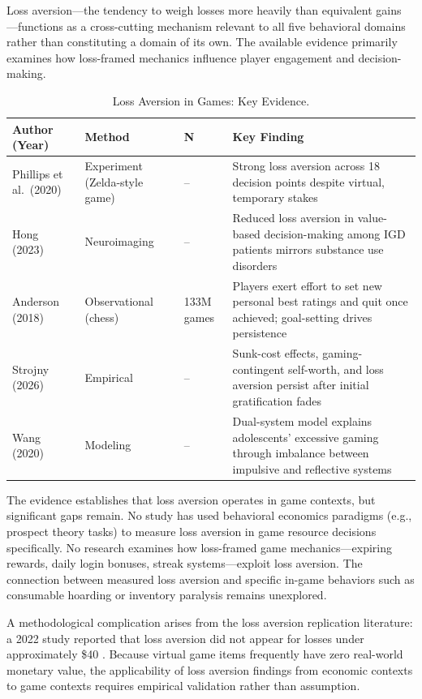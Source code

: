 \documentclass[12pt]{article}
\begin{document}
Loss aversion---the tendency to weigh losses more heavily than equivalent gains \citep{Kahneman1979}---functions as a cross-cutting mechanism relevant to all five behavioral domains rather than constituting a domain of its own. The available evidence primarily examines how loss-framed mechanics influence player engagement and decision-making.

\begin{table}[ht]
\centering
\caption{Loss Aversion in Games: Key Evidence.}
\small
\begin{tabular}{p{3.2cm}p{3cm}p{1.5cm}p{6cm}}
\toprule
Author (Year) & Method & N & Key Finding \\
\midrule
Phillips et al.\ (2020) & Experiment (Zelda-style game) & -- & Strong loss aversion across 18 decision points despite virtual, temporary stakes \\
Hong (2023) & Neuroimaging & -- & Reduced loss aversion in value-based decision-making among IGD patients mirrors substance use disorders \\
Anderson (2018) & Observational (chess) & 133M games & Players exert effort to set new personal best ratings and quit once achieved; goal-setting drives persistence \\
Strojny (2026) & Empirical & -- & Sunk-cost effects, gaming-contingent self-worth, and loss aversion persist after initial gratification fades \\
Wang (2020) & Modeling & -- & Dual-system model explains adolescents' excessive gaming through imbalance between impulsive and reflective systems \\
\bottomrule
\end{tabular}
\end{table}

The evidence establishes that loss aversion operates in game contexts, but significant gaps remain. No study has used behavioral economics paradigms (e.g., prospect theory tasks) to measure loss aversion in game resource decisions specifically. No research examines how loss-framed game mechanics---expiring rewards, daily login bonuses, streak systems---exploit loss aversion. The connection between measured loss aversion and specific in-game behaviors such as consumable hoarding or inventory paralysis remains unexplored.

A methodological complication arises from the loss aversion replication literature: a 2022 study reported that loss aversion did not appear for losses under approximately \$40 \citep{Mrkva2020}. Because virtual game items frequently have zero real-world monetary value, the applicability of loss aversion findings from economic contexts to game contexts requires empirical validation rather than assumption.
\end{document}
